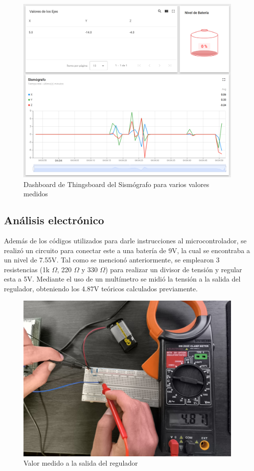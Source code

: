 \documentclass[12pt,a4paper]{article}
\begin{document}
\begin{figure}[H]
    \centering
    \includegraphics[width=1\linewidth]{Imagenes/dash.png}
    \caption{Dashboard de Thingsboard del Sismógrafo para varios valores medidos}
    \label{fig:5}
\end{figure}

\subsection{Análisis electrónico}

Además de los códigos utilizados para darle instrucciones al microcontrolador, se realizó un circuito para conectar este a una batería de 9V, la cual se encontraba a un nivel de 7.55V. Tal como se mencionó anteriormente, se emplearon 3 resistencias (1k $\Omega$, 220 $\Omega$ y 330 $\Omega$) para realizar un divisor de tensión y regular esta a 5V. Mediante el uso de un multímetro se midió la tensión a la salida del regulador, obteniendo los 4.87V teóricos calculados previamente.

\begin{figure}[H]
    \centering
    \includegraphics[width=0.83\linewidth]{Imagenes/bat.jpg}
    \caption{Valor medido a la salida del regulador}
    \label{fig:5}
\end{figure}
\end{document}
